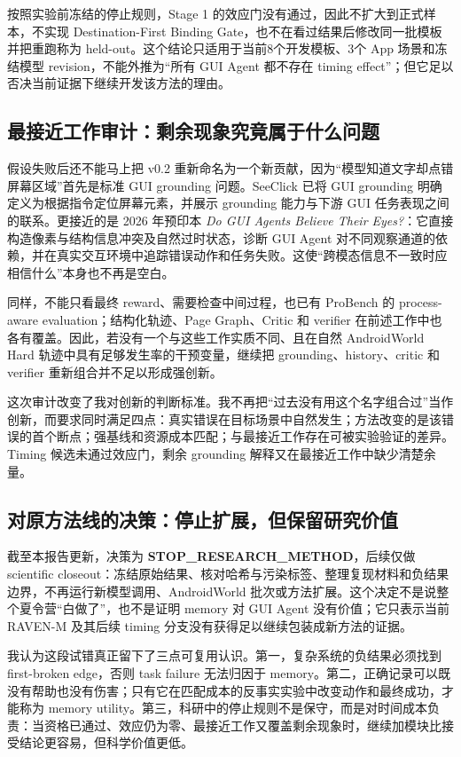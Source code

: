 \documentclass[12pt,a4paper]{ctexart}
\begin{document}
按照实验前冻结的停止规则，Stage 1 的效应门没有通过，因此不扩大到正式样本，不实现 Destination-First Binding Gate，也不在看过结果后修改同一批模板并把重跑称为 held-out。这个结论只适用于当前8个开发模板、3个 App 场景和冻结模型 revision，不能外推为“所有 GUI Agent 都不存在 timing effect”；但它足以否决当前证据下继续开发该方法的理由。

\subsection{最接近工作审计：剩余现象究竟属于什么问题}

假设失败后还不能马上把 v0.2 重新命名为一个新贡献，因为“模型知道文字却点错屏幕区域”首先是标准 GUI grounding 问题。SeeClick 已将 GUI grounding 明确定义为根据指令定位屏幕元素，并展示 grounding 能力与下游 GUI 任务表现之间的联系\cite{seeclick}。更接近的是 2026 年预印本 \textit{Do GUI Agents Believe Their Eyes?}：它直接构造像素与结构信息冲突及自然过时状态，诊断 GUI Agent 对不同观察通道的依赖，并在真实交互环境中追踪错误动作和任务失败\cite{believeeyes}。这使“跨模态信息不一致时应相信什么”本身也不再是空白。

同样，不能只看最终 reward、需要检查中间过程，也已有 ProBench 的 process-aware evaluation\cite{probench}；结构化轨迹、Page Graph、Critic 和 verifier 在前述工作中也各有覆盖。因此，若没有一个与这些工作实质不同、且在自然 AndroidWorld Hard 轨迹中具有足够发生率的干预变量，继续把 grounding、history、critic 和 verifier 重新组合并不足以形成强创新。

这次审计改变了我对创新的判断标准。我不再把“过去没有用这个名字组合过”当作创新，而要求同时满足四点：真实错误在目标场景中自然发生；方法改变的是该错误的首个断点；强基线和资源成本匹配；与最接近工作存在可被实验验证的差异。Timing 候选未通过效应门，剩余 grounding 解释又在最接近工作中缺少清楚余量。

\subsection{对原方法线的决策：停止扩展，但保留研究价值}

截至本报告更新，决策为 \textbf{STOP\_RESEARCH\_METHOD}，后续仅做 scientific closeout：冻结原始结果、核对哈希与污染标签、整理复现材料和负结果边界，不再运行新模型调用、AndroidWorld 批次或方法扩展。这个决定不是说整个夏令营“白做了”，也不是证明 memory 对 GUI Agent 没有价值；它只表示当前 RAVEN-M 及其后续 timing 分支没有获得足以继续包装成新方法的证据。

我认为这段试错真正留下了三点可复用认识。第一，复杂系统的负结果必须找到 first-broken edge，否则 task failure 无法归因于 memory。第二，正确记录可以既没有帮助也没有伤害；只有它在匹配成本的反事实实验中改变动作和最终成功，才能称为 memory utility。第三，科研中的停止规则不是保守，而是对时间成本负责：当资格已通过、效应仍为零、最接近工作又覆盖剩余现象时，继续加模块比接受结论更容易，但科学价值更低。
\end{document}
